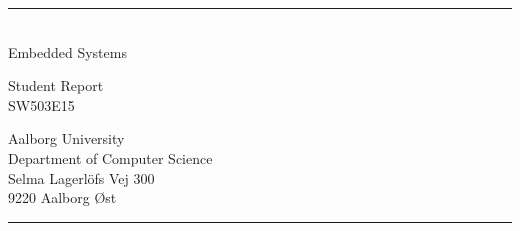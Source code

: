 \begin{titlepage}
    \addtolength{\hoffset}{0.5\evensidemargin-0.5\oddsidemargin}
    \noindent
    \vspace{1.5cm}
    \begin{center}
        \begin{spacing}{2.65} 
            \titlefont
            \TITLE
        \end{spacing}
        \vspace{-20pt}
        \textcolor{aaublue}{\rule{120pt}{2pt}}\\
        \vspace{10pt}
        {\subtitlefont
            Embedded Systems
        }
    \end{center}
    \vspace{4cm}
    \begin{center}
        \begin{spacing}{2}
            \subtitlefont
            Student Report\\
            SW503E15
        \end{spacing}
    \end{center}
    \vfill
    \noindent
\hfill
\begin{minipage}{0.5\linewidth}
    \begin{flushright}
        Aalborg University\\
        Department of Computer Science\\
        Selma Lagerl{\"o}fs Vej 300\\
        9220 Aalborg {\O}st
    \end{flushright}
\end{minipage}
%
\begin{minipage}{0.02\linewidth}
    \textcolor{aaublue}{\rule{1pt}{5\baselineskip}}
\end{minipage}
    \titlepagedecoration
\end{titlepage}
\clearpage 
